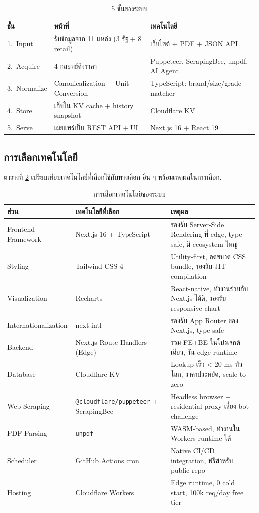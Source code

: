 \begin{table}[H]
\centering
\caption{5 ชั้นของระบบ}
\label{tab:layers}
\begin{tabularx}{\textwidth}{lXX}
\toprule
\textbf{ชั้น} & \textbf{หน้าที่} & \textbf{เทคโนโลยี} \\
\midrule
1.\ Input    & รับข้อมูลจาก 11 แหล่ง (3 รัฐ + 8 retail) & เว็บไซต์ + PDF + JSON API \\
2.\ Acquire  & 4 กลยุทธ์ดึงราคา                          & Puppeteer, ScrapingBee, unpdf, AI Agent \\
3.\ Normalize& Canonicalization + Unit Conversion        & TypeScript: brand/size/grade matcher \\
4.\ Store    & เก็บใน KV cache + history snapshot        & Cloudflare KV \\
5.\ Serve    & เผยแพร่เป็น REST API + UI                  & Next.js 16 + React 19 \\
\bottomrule
\end{tabularx}
\end{table}



\subsection{การเลือกเทคโนโลยี}

ตารางที่ \ref{tab:tech-stack} เปรียบเทียบเทคโนโลยีที่เลือกใช้กับทางเลือก
อื่น ๆ พร้อมเหตุผลในการเลือก.

\begin{table}[H]
\centering
\caption{การเลือกเทคโนโลยีของระบบ}
\label{tab:tech-stack}
\small
\begin{tabularx}{\textwidth}{l X X}
\toprule
\textbf{ส่วน} & \textbf{เทคโนโลยีที่เลือก} & \textbf{เหตุผล} \\
\midrule
Frontend Framework & Next.js 16 + TypeScript &
รองรับ Server-Side Rendering ที่ edge, type-safe, มี ecosystem ใหญ่ \\
Styling & Tailwind CSS 4 &
Utility-first, ลดขนาด CSS bundle, รองรับ JIT compilation \\
Visualization & Recharts &
React-native, ทำงานร่วมกับ Next.js ได้ดี, รองรับ responsive chart \\
Internationalization & next-intl &
รองรับ App Router ของ Next.js, type-safe \\
Backend & Next.js Route Handlers (Edge) &
รวม FE+BE ในโปรเจกต์เดียว, รัน edge runtime \\
Database & Cloudflare KV &
Lookup เร็ว < 20 ms ทั่วโลก, ราคาประหยัด, scale-to-zero \\
Web Scraping & \texttt{@cloudflare/puppeteer} + ScrapingBee &
Headless browser + residential proxy เลี่ยง bot challenge \\
PDF Parsing & \texttt{unpdf} &
WASM-based, ทำงานใน Workers runtime ได้ \\
Scheduler & GitHub Actions cron &
Native CI/CD integration, ฟรีสำหรับ public repo \\
Hosting & Cloudflare Workers &
Edge runtime, 0 cold start, 100k req/day free tier \\
\bottomrule
\end{tabularx}
\end{table}

